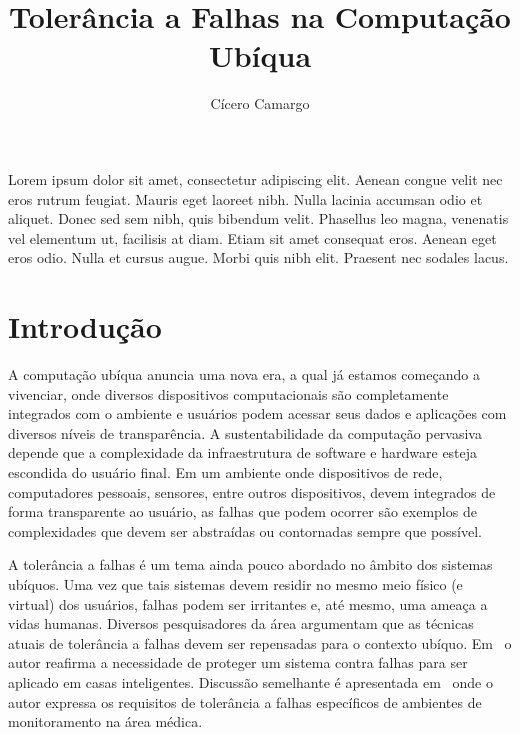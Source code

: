 \documentclass{SBCbookchapter}
\title{Tolerância a Falhas na Computação Ubíqua}
\author{Cícero Camargo}
\begin{document}
\maketitle


\begin{resumo}

Lorem ipsum dolor sit amet, consectetur adipiscing elit. Aenean congue velit nec eros rutrum feugiat. Mauris eget laoreet nibh. Nulla lacinia accumsan odio et aliquet. Donec sed sem nibh, quis bibendum velit. Phasellus leo magna, venenatis vel elementum ut, facilisis at diam. Etiam sit amet consequat eros. Aenean eget eros odio. Nulla et cursus augue. Morbi quis nibh elit. Praesent nec sodales lacus.
	
\end{resumo}

\section{Introdução} %

A computação ubíqua anuncia uma nova era, a qual já estamos começando a vivenciar, onde diversos dispositivos computacionais são completamente integrados com o ambiente e usuários podem acessar seus dados e aplicações com diversos níveis de transparência. A sustentabilidade da computação pervasiva depende que a complexidade da infraestrutura de software e hardware esteja escondida do usuário final. Em um ambiente onde dispositivos de rede, computadores pessoais, sensores, entre outros dispositivos, devem integrados de forma transparente ao usuário, as falhas que podem ocorrer são exemplos de complexidades que devem ser abstraídas ou contornadas sempre que possível.

A tolerância a falhas é um tema ainda pouco abordado no âmbito dos sistemas ubíquos. Uma vez que tais sistemas devem residir no mesmo meio físico (e virtual) dos usuários, falhas podem ser irritantes e, até mesmo, uma ameaça a vidas humanas. Diversos pesquisadores da área argumentam que as técnicas atuais de tolerância a falhas devem ser repensadas para o contexto ubíquo. Em~\cite{Banavar2000} o autor reafirma a necessidade de proteger um sistema contra falhas para ser aplicado em casas inteligentes. Discussão semelhante é apresentada em~\cite{Bohn02} onde o autor expressa os requisitos de tolerância a falhas específicos de ambientes de monitoramento na área médica. %
\end{document}
